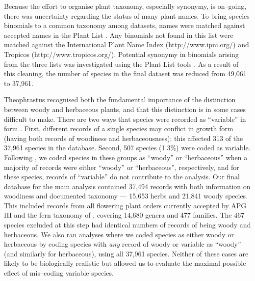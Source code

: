 \documentclass[a4paper,12pt]{article}
\begin{document}
Because the effort to organise plant taxonomy, especially synonymy, is
on--going, there was uncertainty regarding the status of many plant
names.
%
To bring species binomials to a common taxonomy among datasets, names
were matched against accepted names in the Plant List
\citep{ThePlantList}.  Any binomials not found in this list were
matched against the International Plant Name Index
(http://www.ipni.org/) and Tropicos (http://www.tropicos.org/).
Potential synonymy in binomials arising from the three lists was
investigated using the Plant List tools \citep{ThePlantList}.  
As a result of this cleaning, the number of species in the final
dataset was reduced from 49,061 to 37,961.

Theophrastus recognised both the fundamental importance of the
distinction between woody and herbaceous plants, and that this
distinction is in some cases difficult to make.  There are two ways
that species were recorded as ``variable'' in form
\citep{beaulieuHiddenRates}.  First, different records of a single
species may conflict in growth form (having both records of woodiness
and herbaceousness); this affected 313 of the 37,961 species in the
database.
Second, 507 species (1.3\%) were coded as variable.
Following \citet{beaulieuHiddenRates}, we coded species in these groups as ``woody''
or ``herbaceous'' when a majority of records were either ``woody'' or
``herbaceous'', respectively, and for these species, records of ``variable'' do not
contribute to the analysis.
%
%
Our final database for the main analysis contained 37,494 records with
both information on woodiness and documented taxonomy --- 15,653 herbs
and 21,841 woody species.  
This included records from all flowering plant orders currently
accepted by APG III \citep{APG3} and the fern taxonomy of
\citet{apweb}, covering 14,680 genera and 477 families.
The 467 species excluded at this step had identical numbers of records
of being woody and herbaceous.
We also ran analyses where we coded species as either woody or
herbaceous by coding species with \emph{any} record of woody or
variable as ``woody'' (and similarly for herbaceous), using all 37,961
species.  Neither of these cases are likely to be biologically realistic
but allowed us to evaluate the maximal possible effect of mis--coding
variable species.
\end{document}
